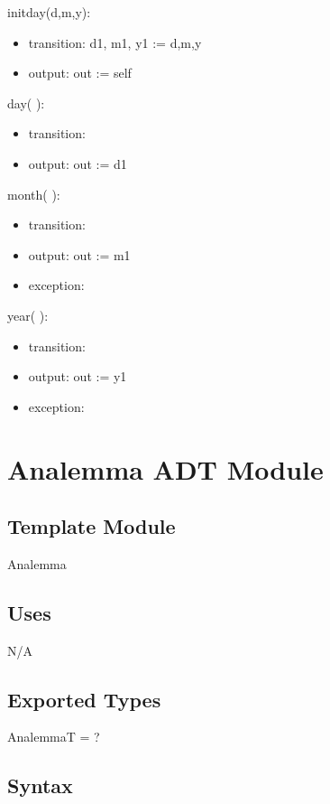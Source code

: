 \documentclass[12pt, titlepage]{article}
\begin{document}
\noindent  initday(d,m,y):
\begin{itemize}
\item transition: d1, m1, y1 := d,m,y
\item output: out := self
\end{itemize}

\noindent day( ):
\begin{itemize}
\item transition:
\item output: out := d1
\end{itemize}

\noindent  month( ):
\begin{itemize}
\item transition:
\item output: out := m1
\item exception: 
\end{itemize}

\noindent  year( ):
\begin{itemize}
\item transition:
\item output: out := y1
\item exception: 
\end{itemize}


\section{Analemma ADT Module} \label{ModuleADTD} 

\subsection{Template Module}
Analemma

\subsection{Uses}

N/A\\

\subsection{Exported Types}

AnalemmaT = ?\\

\subsection{Syntax}
\end{document}
